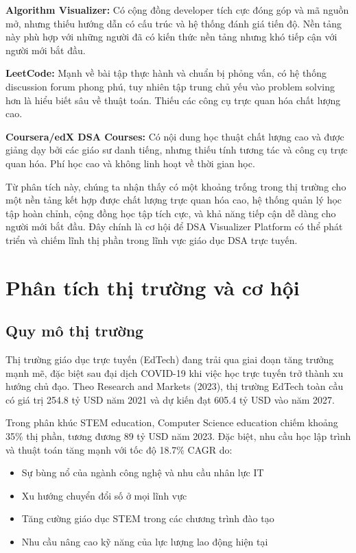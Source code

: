 \textbf{Algorithm Visualizer:} Có cộng đồng developer tích cực đóng góp và mã nguồn mở, nhưng thiếu hướng dẫn có cấu trúc và hệ thống đánh giá tiến độ. Nền tảng này phù hợp với những người đã có kiến thức nền tảng nhưng khó tiếp cận với người mới bắt đầu.

\textbf{LeetCode:} Mạnh về bài tập thực hành và chuẩn bị phỏng vấn, có hệ thống discussion forum phong phú, tuy nhiên tập trung chủ yếu vào problem solving hơn là hiểu biết sâu về thuật toán. Thiếu các công cụ trực quan hóa chất lượng cao.

\textbf{Coursera/edX DSA Courses:} Có nội dung học thuật chất lượng cao và được giảng dạy bởi các giáo sư danh tiếng, nhưng thiếu tính tương tác và công cụ trực quan hóa. Phí học cao và không linh hoạt về thời gian học.

Từ phân tích này, chúng ta nhận thấy có một khoảng trống trong thị trường cho một nền tảng kết hợp được chất lượng trực quan hóa cao, hệ thống quản lý học tập hoàn chỉnh, cộng đồng học tập tích cực, và khả năng tiếp cận dễ dàng cho người mới bắt đầu. Đây chính là cơ hội để DSA Visualizer Platform có thể phát triển và chiếm lĩnh thị phần trong lĩnh vực giáo dục DSA trực tuyến.

\section{Phân tích thị trường và cơ hội}
\label{sec:market-opportunity}

\subsection{Quy mô thị trường}
\label{subsec:market-size}

Thị trường giáo dục trực tuyến (EdTech) đang trải qua giai đoạn tăng trưởng mạnh mẽ, đặc biệt sau đại dịch COVID-19 khi việc học trực tuyến trở thành xu hướng chủ đạo. Theo Research and Markets (2023), thị trường EdTech toàn cầu có giá trị 254.8 tỷ USD năm 2021 và dự kiến đạt 605.4 tỷ USD vào năm 2027.

Trong phân khúc STEM education, Computer Science education chiếm khoảng 35\% thị phần, tương đương 89 tỷ USD năm 2023. Đặc biệt, nhu cầu học lập trình và thuật toán tăng mạnh với tốc độ 18.7\% CAGR do:
\begin{itemize}
\item Sự bùng nổ của ngành công nghệ và nhu cầu nhân lực IT
\item Xu hướng chuyển đổi số ở mọi lĩnh vực
\item Tăng cường giáo dục STEM trong các chương trình đào tạo
\item Nhu cầu nâng cao kỹ năng của lực lượng lao động hiện tại
\end{itemize}

